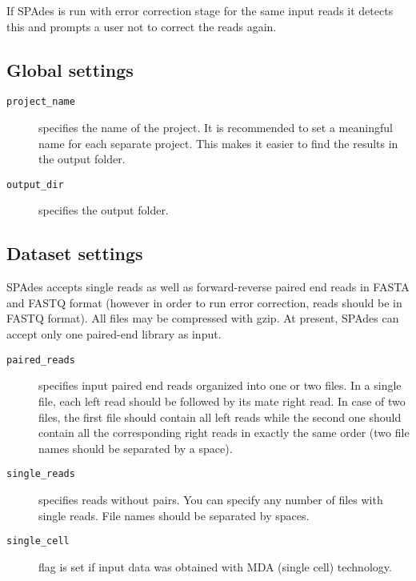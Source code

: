 \documentclass{article}
\def\spades{SPAdes}
\begin{document}
If {\spades} is run with error correction stage for the same input reads it detects this and prompts a user not to correct the reads again. 

\subsection{Global settings}
\begin{description}
\item[{\tt project\_name}] specifies the name of the project. It is recommended to set a meaningful name for each separate project.
This makes it easier to find the results in the output folder.
\item[{\tt output\_dir}] specifies the output folder.
\end{description}

\subsection{Dataset settings}
{\spades} accepts single reads as well as forward-reverse paired end reads
in FASTA and FASTQ format (however in order to run error correction, reads should be in FASTQ format). All files may be compressed with gzip.
At present, {\spades} can accept only one paired-end library as input.

\begin{description}
\item[{\tt paired\_reads}] specifies input paired end reads organized into one or two files.
In a single file, each left read should be followed by its mate right read.
In case of two files, the first file should contain all left reads while the second one should contain
all the corresponding right reads in exactly the same order (two file names should be separated by a space).
\item[{\tt single\_reads}] specifies reads without pairs. You can specify any number of
files with single reads. File names should be separated by spaces.
\item[{\tt single\_cell}] flag is set if input data was obtained with MDA (single cell) technology.
\end{description}
\end{document}
